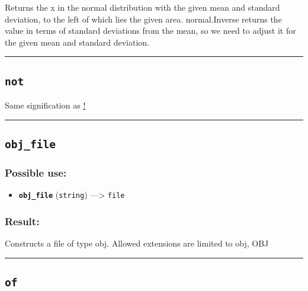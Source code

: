 \documentclass[]{book}
\providecommand{\tightlist}{%
  \setlength{\itemsep}{0pt}\setlength{\parskip}{0pt}}
\theoremstyle{definition}
\theoremstyle{definition}
\theoremstyle{definition}
\theoremstyle{remark}
\begin{document}
Returns the x in the normal distribution with the given mean and
standard deviation, to the left of which lies the given area.
normal.Inverse returns the value in terms of standard deviations from
the mean, so we need to adjust it for the given mean and standard
deviation.

\begin{center}\rule{0.5\linewidth}{\linethickness}\end{center}

\subsection{\texorpdfstring{\texttt{not}}{not}}\label{not}

Same signification as \href{OperatorsAA\#!}{!}

\begin{center}\rule{0.5\linewidth}{\linethickness}\end{center}

\subsection{\texorpdfstring{\texttt{obj\_file}}{obj\_file}}\label{obj_file}

\subsubsection{Possible use:}\label{possible-use-380}

\begin{itemize}
\tightlist
\item
  \textbf{\texttt{obj\_file}} (\texttt{string}) ---\textgreater{}
  \texttt{file}
\end{itemize}

\subsubsection{Result:}\label{result-366}

Constructs a file of type obj. Allowed extensions are limited to obj,
OBJ

\begin{center}\rule{0.5\linewidth}{\linethickness}\end{center}

\subsection{\texorpdfstring{\texttt{of}}{of}}\label{of}
\end{document}
